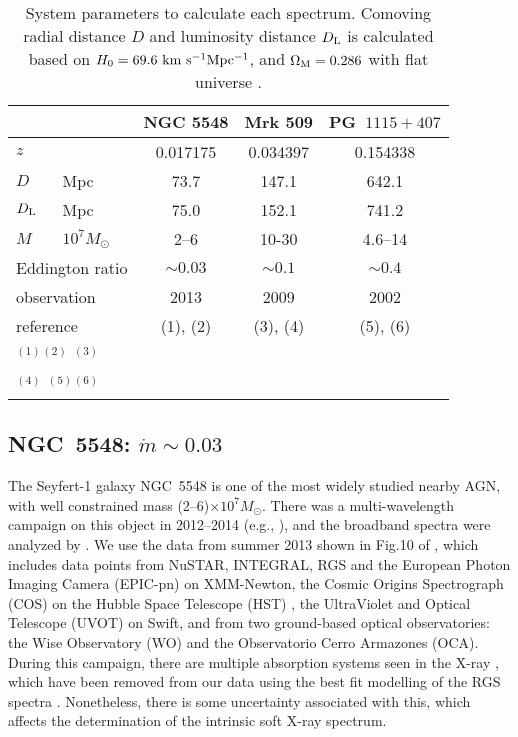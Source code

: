\documentclass[a4paper,fleqn,usenatbib]{mnras}
\begin{document}
\begin{table}
	\centering
	\caption{System parameters to calculate each spectrum. Comoving radial distance $D$ and 
	luminosity distance $D_{\rm L}$ is calculated based on $H_0=69.6~{\rm km~s^{-1}Mpc^{-1}}$, 
and $\Omega_{\rm M}=0.286$ with flat universe \citep{wright2006}. 
}
	\label{tab:system}
	\begin{tabular}{llccc} 
		\hline
& &NGC 5548&Mrk 509&PG~$1115+407$\\ 
\hline \hline
$z$ &&0.017175&0.034397&0.154338\\
$D$&Mpc&73.7&147.1&642.1\\ 
$D_{\rm L}$&Mpc&75.0&152.1&741.2 \\ 
\hline
$M$&$10^7M_\odot$&2--6& 10-30 &4.6--14\\
\hline
\multicolumn{2}{l}{Eddington ratio}&$\sim0.03$&$\sim0.1$&$\sim0.4$\\
\hline
\multicolumn{2}{l}{observation} &2013&2009&2002\\
\multicolumn{2}{l}{reference} &(1), (2)&(3), (4)&(5), (6)\\
\hline
\multicolumn{5}{l}{$^{(1)}$\citealt{kaastra2014}$^{(2)}$\citealt{5548} $^{(3)}$\citealt{kaastra2011-1} 
}\\
\multicolumn{5}{l}{
$^{(4)}$\citealt{509}  
$^{(5)}$\citealt{jin2012a}$^{(6)}$\citealt{jin2012b}}
	\end{tabular}
\end{table}

\subsection{NGC~5548: $\dot{m}\sim0.03$}
\label{sec:ngc5548}


The Seyfert-1 galaxy NGC~5548 is one of the most widely studied nearby
AGN, with well constrained mass (2--6)$\times 10^7M_\odot$.  There was
a multi-wavelength campaign on this object in 2012--2014 (e.g.,
\citealt{kaastra2014}), and the broadband spectra were analyzed by
\cite{5548}.
We use the data from summer 2013 shown in Fig.10 of
\cite{5548},
which includes data points from  NuSTAR, INTEGRAL,  RGS and the European Photon Imaging Camera 
(EPIC-pn) on XMM-Newton, the Cosmic Origins Spectrograph (COS) on the Hubble Space Telescope (HST) , 
the UltraViolet and Optical Telescope (UVOT) on  Swift, and from two ground-based optical observatories: the Wise Observatory (WO) and the Observatorio Cerro Armazones (OCA). 
During this campaign, there are multiple absorption systems seen in the X-ray  \citep{5548,kaastra2014,cappi2016}, 
which have been removed from our data using the best fit modelling of the RGS spectra
\citep{5548}. Nonetheless, 
there is some uncertainty associated with this, which affects the 
determination of the intrinsic soft X-ray spectrum.
\end{document}
